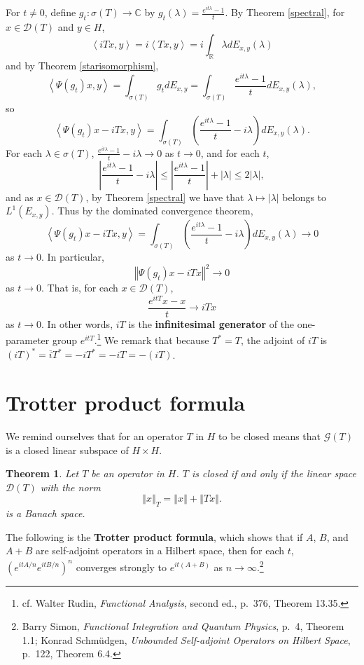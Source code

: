 \documentclass{article}
\newcommand{\inner}[2]{\left\langle #1, #2 \right\rangle}
\newcommand{\norm}[1]{\left\Vert #1 \right\Vert}
\newtheorem{theorem}{Theorem}
\theoremstyle{definition}
\begin{document}
For $t \neq 0$, define $g_t:\sigma(T) \to \mathbb{C}$ by $g_t(\lambda) = \frac{e^{it\lambda}-1}{t}$.
By Theorem \ref{spectral},  for $x \in \mathscr{D}(T)$ and $y \in H$,
\[
\inner{iTx}{y} = i\inner{Tx}{y} = i\int_{\mathbb{R}} \lambda dE_{x,y}(\lambda)
\]
and 
by Theorem \ref{starisomorphism},
\[
\inner{\Psi(g_t)x}{y} = \int_{\sigma(T)} g_t dE_{x,y} = \int_{\sigma(T)} \frac{e^{it\lambda}-1}{t} dE_{x,y}(\lambda),
\]
so
\[
\inner{\Psi(g_t)x-iTx}{y} = \int_{\sigma(T)} \left( \frac{e^{it\lambda}-1}{t} - i\lambda \right) dE_{x,y}(\lambda).
\]
For each $\lambda \in \sigma(T)$, $\frac{e^{it\lambda}-1}{t} - i\lambda \to 0$ as $t \to 0$, and 
for each $t$,
\[
\left|\frac{e^{it\lambda}-1}{t} - i\lambda\right| \leq \left|\frac{e^{it\lambda}-1}{t}\right| + |\lambda|
\leq 2|\lambda|,
\]
and as $x \in \mathscr{D}(T)$, by Theorem \ref{spectral} we have that $\lambda \mapsto |\lambda|$ belongs
 to $L^1(E_{x,y})$. Thus by the dominated convergence theorem,
\[
\inner{\Psi(g_t)x-iTx}{y} = \int_{\sigma(T)} \left( \frac{e^{it\lambda}-1}{t} - i\lambda \right) dE_{x,y}(\lambda) \to 0
\]
as $t \to 0$. In particular, 
\[
\norm{\Psi(g_t)x-iTx}^2 \to 0
\]
as $t \to 0$. That is, for each $x \in \mathscr{D}(T)$,
\[
\frac{e^{itT}x-x}{t} \to iTx
\]
as $t \to 0$. In other words, $iT$ is the \textbf{infinitesimal generator} of the one-parameter group
$e^{itT}$.\footnote{cf. Walter Rudin, {\em Functional Analysis}, second ed., p.~376, Theorem 13.35.} We remark that because
$T^*=T$, the adjoint
of $iT$ is $(iT)^*=\overline{i} T^*=-iT^*=-iT=-(iT)$. 


\section{Trotter product formula}
We remind ourselves that for an operator $T$ in $H$ to be closed means that $\mathscr{G}(T)$ is a closed linear subspace
of $H \times H$.

\begin{theorem}
Let $T$ be an operator in $H$. $T$ is closed if and only if the linear space $\mathscr{D}(T)$ with the norm
\[
\norm{x}_T = \norm{x}+\norm{Tx}.
\]
is a Banach space.
\label{DT}
\end{theorem}


The following is the \textbf{Trotter product formula},
which shows that if $A$, $B$, and $A+B$ are self-adjoint operators  in a  Hilbert space, then
for each $t$, 
$(e^{itA/n} e^{itB/n})^n$ converges strongly to
$e^{it(A+B)}$  as $n \to \infty$.\footnote{Barry Simon, {\em Functional Integration and Quantum Physics}, p.~4, Theorem 1.1; 
Konrad Schm\"udgen, {\em Unbounded Self-adjoint Operators on Hilbert Space}, p.~122, Theorem 6.4.}
\end{document}

